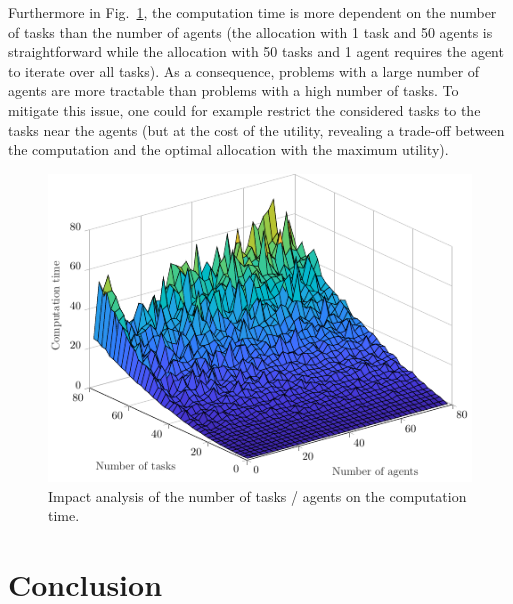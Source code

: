 \documentclass{ifacconf}
\begin{document}
Furthermore in Fig.~\ref{fig:nTnAComputationTime}, the computation time is more dependent on the number of tasks than the number of agents (the allocation with 1 task and 50 agents is straightforward while the allocation with 50 tasks and 1 agent requires the agent to iterate over all tasks). As a consequence, problems with a large number of agents are more tractable than problems with a high number of tasks. To mitigate this issue, one could for example restrict the considered tasks to the tasks near the agents (but at the cost of the utility, revealing a trade-off between the computation and the optimal allocation with the maximum utility).

\begin{figure}[h]
  \centering
  \includegraphics[width=0.7\linewidth]{Figures/nTnAComputationTime.pdf}
  \caption{Impact analysis of the number of tasks / agents on the computation time.}
  \label{fig:nTnAComputationTime}
\end{figure}

\section{Conclusion}\label{s:concl}
\end{document}
